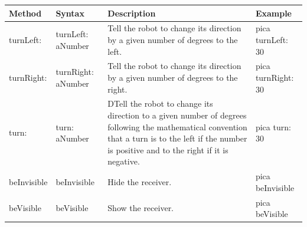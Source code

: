 \documentclass[a4paper,10pt,twoside]{book}
\begin{document}
\vspace*{5mm}
\noindent
\setlength{\extrarowheight}{1mm}
{\small \begin{tabular}{p{14mm}p{23mm}p{45mm}p{22mm}}
\hline
\textbf{Method} & \textbf{Syntax} & \textbf{Description} & \textbf{Example}\\
\hline
\textsf{turnLeft:} & \textsf{turnLeft: aNumber} &
Tell the robot to change its direction by a given number of degrees to the left. 
& \textsf{pica turnLeft: 30 } \\

\textsf{turnRight:} & \textsf{turnRight: aNumber} &
Tell the robot to change its 
direction by a given number 
of degrees to the right.
& \textsf{pica turnRight: 30} \\


\textsf{turn:} & \textsf{turn: aNumber} &
DTell the robot to change its  
direction to a given number 
of degrees following the 
mathematical convention 
that a turn is to the left if the 
number is positive and to 
the right if it is negative.
& \textsf{pica turn: 30} \\

\textsf{beInvisible} & \textsf{beInvisible} &
Hide the receiver. 
& \textsf{pica beInvisible} \\

\textsf{beVisible} & \textsf{beVisible} &
Show the receiver. 
& \textsf{pica beVisible} \\
\hline
\end{tabular}}


\ifx\wholebook\relax\else
    
\end{document}
